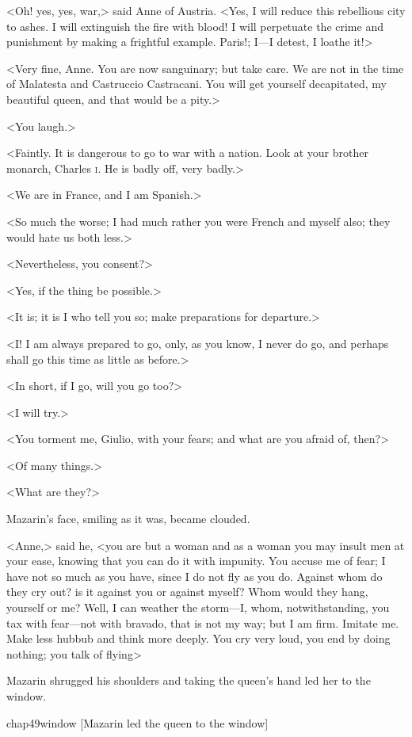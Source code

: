 <Oh! yes, yes, war,> said Anne of Austria. <Yes, I will reduce this rebellious city to ashes. I will extinguish the fire with blood! I will perpetuate the crime and punishment by making a frightful example. Paris!; I—I detest, I loathe it!>

<Very fine, Anne. You are now sanguinary; but take care. We are not in the time of Malatesta and Castruccio Castracani. You will get yourself decapitated, my beautiful queen, and that would be a pity.>

<You laugh.>

<Faintly. It is dangerous to go to war with a nation. Look at your brother monarch, Charles \textsc{i}.  He is badly off, very badly.>

<We are in France, and I am Spanish.>

<So much the worse; I had much rather you were French and myself also; they would hate us both less.>

<Nevertheless, you consent?>

<Yes, if the thing be possible.>

<It is; it is I who tell you so; make preparations for departure.>

<I! I am always prepared to go, only, as you know, I never do go, and perhaps shall go this time as little as before.>

<In short, if I go, will you go too?>

<I will try.>

<You torment me, Giulio, with your fears; and what are you afraid of, then?>

<Of many things.>

<What are they?>

Mazarin's face, smiling as it was, became clouded.

<Anne,> said he, <you are but a woman and as a woman you may insult men at your ease, knowing that you can do it with impunity. You accuse me of fear; I have not so much as you have, since I do not fly as you do. Against whom do they cry out? is it against you or against myself? Whom would they hang, yourself or me? Well, I can weather the storm—I, whom, notwithstanding, you tax with fear—not with bravado, that is not my way; but I am firm. Imitate me. Make less hubbub and think more deeply. You cry very loud, you end by doing nothing; you talk of flying\longdash>

Mazarin shrugged his shoulders and taking the queen's hand led her to the window.

\begin{bwbigpic}
	[\basicscale] 
	{chap49window}
	[Mazarin led the queen to the window]
\end{bwbigpic}

